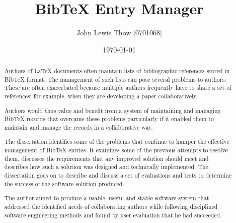 \documentclass{l4proj}
\newcommand{\BibTeX}{B{\sc ib}\TeX}
\newcommand{\bibtex}{\BibTeX}
\newcommand{\latex}{\LaTeX{} }
\newcommand{\cs}{C\#}
\begin{document}
\title{\bibtex{} Entry Manager}
\author{John Lewis Thow [0701068]}
\date{\today}
\maketitle


\begin{abstract}
Authors of \latex documents often maintain lists of bibliographic references stored in \bibtex{} format.  The management of such lists can pose several problems to authors. These are often exacerbated because multiple authors frequently have to share a set of references; for example, when they are developing a paper collaboratively.

Authors would thus value and benefit from a system of maintaining and managing \bibtex{} records that overcame these problems particularly if it enabled them to maintain and manage the records in a collaborative way. 

The dissertation identifies some of the problems that continue to hamper the effective management of \bibtex{} entries.  It examines some of the previous attempts to resolve them, discusses the requirements that any improved solution should meet and describes how such a solution was designed and technically implemented.  The dissertation goes on to describe and discuss a set of evaluations and tests to determine the success of the software solution produced.

The author aimed to produce a usable, useful and stable software system that addressed the identified needs of collaborating authors while following disciplined software engineering methods and found by user evaluation that he had succeeded.
\end{abstract}


\newpage
\end{document}
